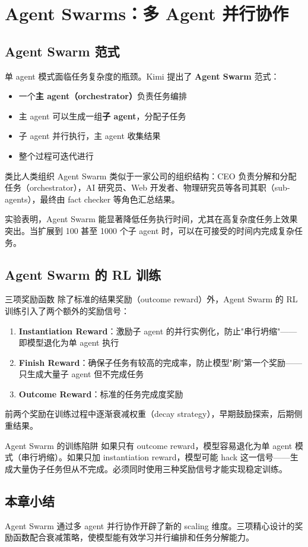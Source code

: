 \section{Agent Swarms：多 Agent 并行协作}

\subsection{Agent Swarm 范式}

单 agent 模式面临任务复杂度的瓶颈。Kimi 提出了 \textbf{Agent Swarm} 范式：

\begin{itemize}
    \item 一个\textbf{主 agent（orchestrator）}负责任务编排
    \item 主 agent 可以生成一组\textbf{子 agent}，分配子任务
    \item 子 agent 并行执行，主 agent 收集结果
    \item 整个过程可迭代进行
\end{itemize}

\begin{knowledgebox}{类比人类组织}
Agent Swarm 类似于一家公司的组织结构：CEO 负责分解和分配任务（orchestrator），AI 研究员、Web 开发者、物理研究员等各司其职（sub-agents），最终由 fact checker 等角色汇总结果。
\end{knowledgebox}

实验表明，Agent Swarm 能显著降低任务执行时间，尤其在高复杂度任务上效果突出。当扩展到 100 甚至 1000 个子 agent 时，可以在可接受的时间内完成复杂任务。

\subsection{Agent Swarm 的 RL 训练}

\begin{importantbox}{三项奖励函数}
除了标准的结果奖励（outcome reward）外，Agent Swarm 的 RL 训练引入了两个额外的奖励信号：
\begin{enumerate}
    \item \textbf{Instantiation Reward}：激励子 agent 的并行实例化，防止"串行坍缩"——即模型退化为单 agent 执行
    \item \textbf{Finish Reward}：确保子任务有较高的完成率，防止模型"刷"第一个奖励——只生成大量子 agent 但不完成任务
    \item \textbf{Outcome Reward}：标准的任务完成度奖励
\end{enumerate}
前两个奖励在训练过程中逐渐衰减权重（decay strategy），早期鼓励探索，后期侧重结果。
\end{importantbox}

\begin{warningbox}{Agent Swarm 的训练陷阱}
如果只有 outcome reward，模型容易退化为单 agent 模式（串行坍缩）。如果只加 instantiation reward，模型可能 hack 这一信号——生成大量伪子任务但从不完成。必须同时使用三种奖励信号才能实现稳定训练。
\end{warningbox}

\subsection{本章小结}

Agent Swarm 通过多 agent 并行协作开辟了新的 scaling 维度。三项精心设计的奖励函数配合衰减策略，使模型能有效学习并行编排和任务分解能力。


